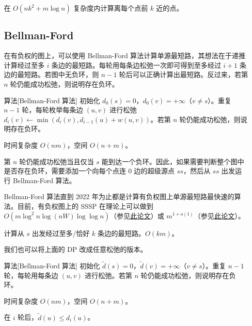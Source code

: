 \begin{exercise}
    在 $O(nk^2+m\log n)$ 复杂度内计算离每个点前 $k$ 近的点。
\end{exercise}

\subsection{Bellman-Ford}

在有负权的图上，可以使用 Bellman-Ford 算法计算单源最短路，其想法在于递推计算经过至多 $i$ 条边的最短路。每轮用每条边松弛一次即可得到至多经过 $i+1$ 条边的最短路。若图中无负环，则 $n-1$ 轮后可以正确计算出最短路。反过来，若第 $n$ 轮仍能成功松弛，则说明存在负环。

\begin{descbox}{算法}[Bellman-Ford 算法]
    初始化 $d_0(s)=0$，$d_0(v)=+\infty$（$v\ne s$）。重复 $n-1$ 轮，每轮枚举每条边 $(u,v)$ 进行松弛 $d_i(v)\gets \min(d_i(v),d_{i-1}(u)+w(u,v))$。若第 $n$ 轮仍能成功松弛，则说明存在负环。

    时间复杂度 $O(nm)$，空间 $O(n+m)$。
\end{descbox}
\begin{remark}
    第 $n$ 轮仍能成功松弛当且仅当 $s$ 能到达一个负环。因此，如果需要判断整个图中是否存在负环，需要添加一个向每个点连 $0$ 边的超级源点 $ss$，然后从 $ss$ 出发运行 Bellman-Ford 算法。
\end{remark}
\begin{remark}
    Bellman-Ford 算法直到 2022 年为止都是计算有负权图上单源最短路最快速的算法。目前，有负权图上的 SSSP 在理论上可以做到 $O(m\log^2 n\log(nW)\log\log n)$（参见\href{https://arxiv.org/abs/2304.05279}{此论文}）或 $m^{1+o(1)}$（参见\href{https://arxiv.org/abs/2607.19346}{此论文}）。
\end{remark}

\begin{exercise}
    计算从 $s$ 出发经过至多/恰好 $k$ 条边的最短路。$O(km)$。
\end{exercise}

我们也可以将上面的 DP 改成任意松弛的版本。
\begin{descbox}{算法}[Bellman-Ford 算法]
    初始化 $\tilde d(s)=0$，$\tilde d(v)=+\infty$（$v\ne s$）。重复 $n-1$ 轮，每轮用每条边 $(u,v)$ 进行松弛。若第 $n$ 轮仍能成功松弛，则说明存在负环。

    时间复杂度 $O(nm)$，空间 $O(n+m)$。
\end{descbox}
\begin{lemma}
    在 $i$ 轮后，$\tilde d(u)\le d_i(u)$。
\end{lemma}

